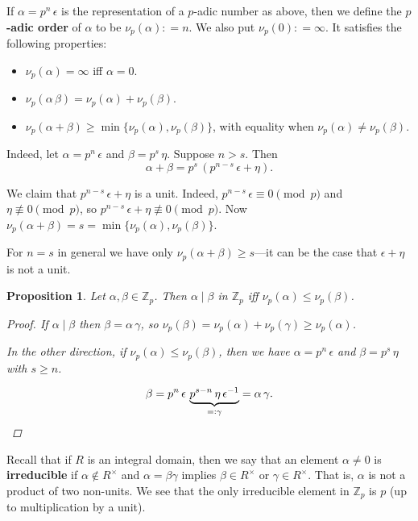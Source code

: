 \documentclass{article}
\newcommand{\term}{\textbf}
\newcommand{\dfn}{\mathrel{\mathop:}=}
\newcommand{\rdfn}{=\mathrel{\mathop:}}
\newcommand{\ZZ}{\mathbb{Z}}
\theoremstyle{myplain}
\newtheorem{proposition}{Proposition}[section]
\theoremstyle{mydefinition}
\begin{document}
If $\alpha = p^n\,\epsilon$ is the representation of a $p$-adic number as above,
then we define the \term{$p$-adic order} of $\alpha$ to be
$\nu_p (\alpha) \dfn n$. We also put $\nu_p (0) \dfn \infty$. It satisfies the
following properties:

\begin{itemize}
\item $\nu_p (\alpha) = \infty$ iff $\alpha = 0$.

\item $\nu_p (\alpha\,\beta) = \nu_p (\alpha) + \nu_p (\beta)$.

\item $ \nu_p (\alpha + \beta) \ge \min \{ \nu_p (\alpha), \nu_p (\beta) \}$,
  with equality when $\nu_p (\alpha) \ne \nu_p (\beta)$.
\end{itemize}

Indeed, let $\alpha = p^n\,\epsilon$ and $\beta = p^s\,\eta$. Suppose
$n > s$. Then
\[ \alpha+\beta = p^s \, (p^{n-s} \, \epsilon + \eta). \]

We claim that $p^{n-s} \, \epsilon + \eta$ is a unit. Indeed,
$p^{n-s}\,\epsilon \equiv 0 \pmod{p}$ and $\eta \not\equiv 0 \pmod{p}$,
so $p^{n-s}\,\epsilon + \eta \not\equiv 0 \pmod{p}$.
Now $\nu_p (\alpha + \beta) = s = \min \{\nu_p (\alpha), \nu_p (\beta) \}$.

For $n = s$ in general we have only $\nu_p (\alpha + \beta) \ge s$---it can be
the case that $\epsilon + \eta$ is not a unit.

\begin{proposition}
  Let $\alpha, \beta \in \ZZ_p$. Then $\alpha \mid \beta$ in $\ZZ_p$ iff
  $ \nu_p (\alpha) \le \nu_p (\beta)$.

  \begin{proof}
    If $\alpha \mid \beta$ then $\beta = \alpha\,\gamma$, so
    $ \nu_p (\beta) = \nu_p (\alpha) + \nu_p (\gamma) \ge \nu_p (\alpha)$.

    In the other direction, if $ \nu_p (\alpha) \le \nu_p (\beta)$, then we have
    $\alpha = p^n\,\epsilon$ and $\beta = p^s\,\eta$ with $s \ge n$.

    \[ \beta = p^n\,\epsilon\,\underbrace{p^{s-n}\,\eta\,\epsilon^{-1}}_{\rdfn \gamma} =
      \alpha\,\gamma. \qedhere \]
  \end{proof}
\end{proposition}

Recall that if $R$ is an integral domain, then we say that an element
$\alpha \ne 0$ is \term{irreducible} if $\alpha \notin R^\times$ and
$\alpha = \beta\gamma$ implies $\beta \in R^\times$ or $\gamma \in
R^\times$. That is, $\alpha$ is not a product of two non-units. We see that the
only irreducible element in $\ZZ_p$ is $p$ (up to multiplication by a unit).
\end{document}
